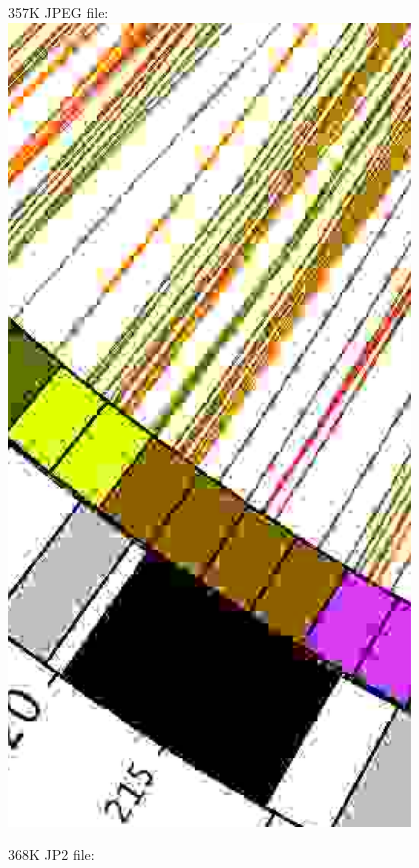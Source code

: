 \documentclass[a4paper,USenglish]{lipics}
\begin{document}
\begin{figure}
\begin{minipage}[b]{0.25\textwidth}
357K JPEG file:\\
\includegraphics[width=0.95\textwidth]{images/c_jpeg}
\end{minipage}%
\begin{minipage}[b]{0.25\textwidth}
368K JP2 file:\\

\end{minipage}
\end{figure}
\end{document}
